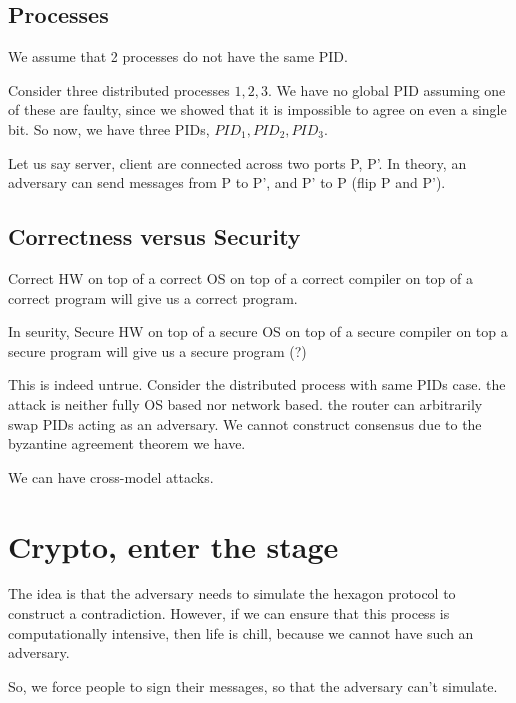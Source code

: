 \subsection{Processes}

We assume that 2 processes do not have the same PID.


Consider three distributed processes $1, 2, 3$. We have no global PID
assuming one of these are faulty, since we showed that it is impossible to agree
on even a single bit.
So now, we have three PIDs, $PID_1, PID_2, PID_3$.


Let us say server, client are connected across two ports P, P'. In theory,
an adversary can send messages from P to P', and P' to P (flip P and P').


\subsection{Correctness versus Security}

Correct HW on top of a correct OS on top of a correct compiler on top of a 
correct program will give us a correct program.

In seurity,
Secure HW on top of a secure OS on top of a secure compiler on top a secure
program will give us a secure program (?)

This is indeed untrue.
Consider the distributed process with same PIDs case. the attack is neither
fully OS based nor network based. the router can arbitrarily swap PIDs 
acting as an adversary. We cannot construct consensus due to the byzantine
agreement theorem we have.

We can have cross-model attacks.

\section{Crypto, enter the stage}

The idea is that the adversary needs to simulate the hexagon protocol to 
construct a contradiction. However, if we can ensure that this process
is computationally intensive, then life is chill, because we cannot
have such an adversary.

So, we force people to sign their messages, so that the adversary
can't simulate.
